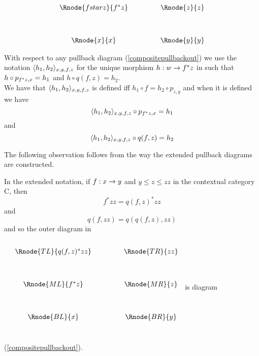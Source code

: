 \vspace{3mm}
\begin{center}
\begin{equation}
\label{compositepullbackout}
\begin{array}{cp{.9cm}c}
\Rnode{fstarz}{f^*z} & & \Rnode{z}{z}\\ [1.2cm]
\Rnode{x}{x}         & & \Rnode{y}{y}
\end{array}
\end{equation}
\end{center}
\newcommand{\pbpair}[2]{\tuple{#2}_{#1}}
With respect to any pullback diagram (\ref{compositepullbackout})
 we use the notation $\pbpair{x,y,f,z}{h_1,h_2}$  for the unique morphism   
$h:w \rightarrow f ^* z$ in  such that
$h \circ p_{f ^* z,x} = h_1$ and $h \circ q(f,z) = h_2$.\\

We  have that $\pbpair{x,y,f,z}{h_1,h_2}$ is defined iff $h_1 \circ f=h_2\circ p_{z,y}$
and when it is defined we have
\begin{equation}
\pbpair{x,y,f,z}{h_1,h_2} \circ p_{f^*z,x} = h_1
\end{equation}
and
\begin{equation}
\pbpair{x,y,f,z}{h_1,h_2} \circ q(f,z) = h_2
\end{equation}

The following observation
follows from the way the extended pullback diagrams are constructed. 
\begin{lemma}
In the extended notation, if $f: x \rightarrow y$ 
and $y \leq z \leq zz$ in the contextual category C, then
\begin{equation}
f^*zz = q(f, z)^*zz
\end{equation}
 and 
\begin{equation}
q(f, zz) = q(q(f, z), zz)
\end{equation}
and so the outer diagram in
\renewcommand{\pc}[2]{p_{#1,#2}}  %
$
\begin{array}{ccp{.9cm}c}
\\[0.25cm]
&\Rnode{TL}{q(f,z)^*zz} & & \Rnode{TR}{zz}\\ [1.2cm]
&\Rnode{ML}{f^*z} & & \Rnode{MR}{z}\\ [1.2cm]
&\Rnode{BL}{x}         & & \Rnode{BR}{y} \\[1.0cm]
\end{array}
$
is diagram (\ref{compositepullbackout}). 
\end{lemma}

